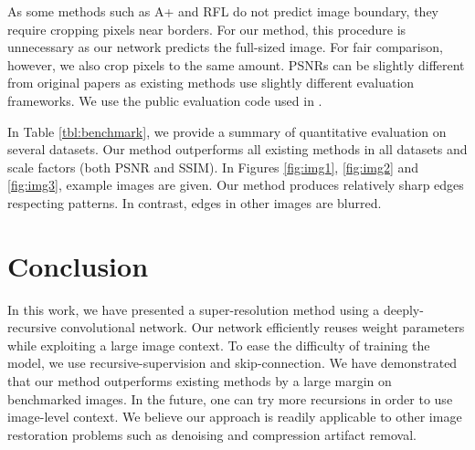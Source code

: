 \documentclass[10pt,twocolumn,letterpaper]{article}
\begin{document}
As  some methods such as A+ \cite{Timofte} and  RFL \cite{schulter2015fast} do not predict image boundary, they require cropping pixels near borders. For our method, this procedure is unnecessary as our network predicts the full-sized image. For fair comparison, however, we also crop pixels to the same amount. PSNRs can be slightly different from original papers as existing methods use slightly different evaluation frameworks. We use the public evaluation code used in \cite{Huang-CVPR-2015}.

In Table \ref{tbl:benchmark}, we provide a summary of quantitative evaluation on several datasets. 
Our method outperforms all existing methods in all datasets and scale factors (both PSNR and SSIM). In Figures \ref{fig:img1}, \ref{fig:img2} and \ref{fig:img3}, example images are given. Our method produces relatively sharp edges respecting patterns. In contrast, edges in other images are blurred.

\section{Conclusion}
In this work, we have presented a super-resolution method using a deeply-recursive convolutional network. Our network efficiently reuses weight parameters while exploiting a large image context. To ease the difficulty of training the model, we use recursive-supervision and skip-connection. We have demonstrated that our method outperforms existing methods by a large margin on benchmarked images. In the future, one can try more recursions in order to use image-level context. We believe our approach is readily applicable to other image restoration problems such as denoising and compression artifact removal.

{\small
	
	
}
\end{document}
